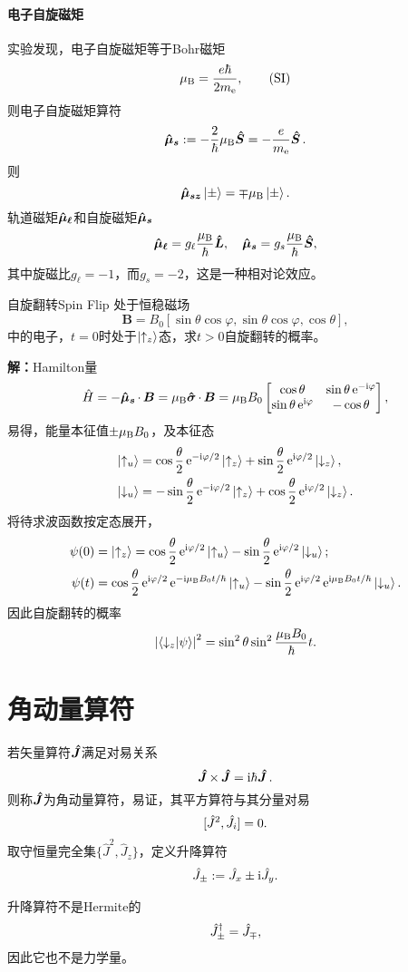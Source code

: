 \paragraph{电子自旋磁矩}实验发现，电子自旋磁矩等于Bohr磁矩
\[
	\muB=\frac{e\hbar}{2m_\elc},\lSI
\]
则电子自旋磁矩算符
\[
	\qo{\mu_s}:=-\frac2\hbar\muB\qo S=-\frac e{m_\elc}\qo S.
\]
则
\[
	\qo{\mu_{sz}}\ket\pm=\mp\muB\ket\pm.
\]
轨道磁矩$\qo{\mu_\ell}$和自旋磁矩$\qo{\mu_s}$
\[
	\qo{\mu_\ell}=g_\ell\frac\muB\hbar\qo L,\quad\qo{\mu_s}=g_s\frac\muB\hbar\qo S,
\]
其中旋磁比$g_\ell=-1$，而$g_s=-2$，这是一种相对论效应。
\begin{example}{自旋翻转}{Spin Flip}
	处于恒稳磁场
	\[
		\bm B=B_0[\sin\theta\cos\varphi,\sin\theta\cos\varphi,\cos\theta],
\]
	中的电子，$t=0$时处于$\ket{\uparrow_z}$态，求$t>0$自旋翻转的概率。
	
	\textbf{解：}\quad Hamilton量
	\[
		\hat H=-\qo{\mu_s}\cdot\,\bm B=\muB\qo\sigma\cdot\,\bm B=\muB B_0\begin{bmatrix}
		\cos\theta&\sin\theta\e{-\i\varphi}\\\sin\theta\e{\i\varphi}&-\cos\theta
	\end{bmatrix},
\]
	易得，能量本征值$\pm\muB B_0$，及本征态
	\begin{align*}
		\ket{\uparrow_u}&=\cos\frac\theta{2}\e{-\i\varphi/2}\ket{\uparrow_z}+\sin\frac\theta{2}\e{\i\varphi/2}\ket{\downarrow_z},\\
		\ket{\downarrow_u}&=-\sin\frac\theta{2}\e{-\i\varphi/2}\ket{\uparrow_z}+\cos\frac\theta{2}\e{\i\varphi/2}\ket{\downarrow_z}.
	\end{align*}
	将待求波函数按定态展开，
	\begin{align*}
		\psi(0)&=\ket{\uparrow_z}=\cos\frac\theta{2}\e{\i\varphi/2}\ket{\uparrow_u}-\sin\frac\theta{2}\e{\i\varphi/2}\ket{\downarrow_u};\\
		\psi(t)&=\cos\frac\theta{2}\e{\i\varphi/2}\e{-\i\muB B_0t/\hbar}\ket{\uparrow_u}-\sin\frac\theta{2}\e{\i\varphi/2}\e{\i\muB B_0t/\hbar}\ket{\downarrow_u}.
	\end{align*}
	因此自旋翻转的概率
	\[
		\abs{\brkt{\downarrow_z}{\psi}}^2=\sin^2\theta\sin^2\frac{\muB B_0}\hbar t.
\]
\end{example}
\section{角动量算符}
若矢量算符$\qo J$满足对易关系
\[
	\qo J\times\,\qo J=\i\hbar\qo J.
\]
则称$\qo J$为角动量算符，易证，其平方算符与其分量对易
\[
	\cmm {J^2}{J_i}=0.
\]
取守恒量完全集$\{\hat J^2,\hat J_z\}$，定义升降算符
\begin{align}
	\hat J_\pm:=\hat J_x\pm\i\hat J_y.
\end{align}
\begin{remark}
	升降算符不是Hermite的
	\[
		\hat J_\pm\dg=\hat J_\mp,
	\]
	因此它也不是力学量。
\end{remark}

